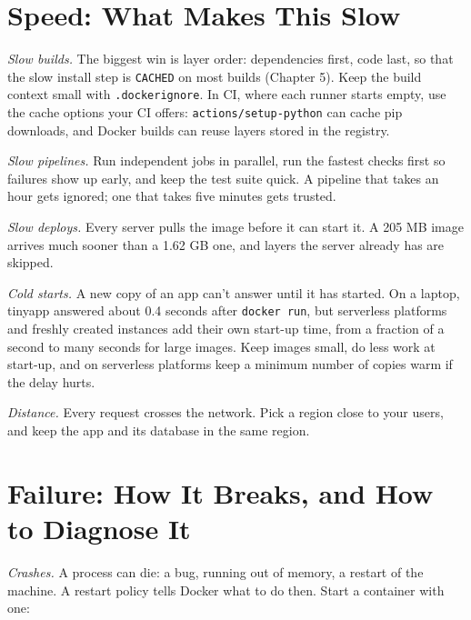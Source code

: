 \section{Speed: What Makes This Slow}\label{12-security-speed-failure-and-cost:speed-what-makes-this-slow}

\emph{Slow builds.} The biggest win is layer order: dependencies first, code last, so that the slow install step is \texttt{CACHED} on most builds (Chapter 5). Keep the build context small with \texttt{.dockerignore}. In CI, where each runner starts empty, use the cache options your CI offers: \texttt{actions/}\allowbreak{}\texttt{setup-python} can cache pip downloads, and Docker builds can reuse layers stored in the registry.

\emph{Slow pipelines.} Run independent jobs in parallel, run the fastest checks first so failures show up early, and keep the test suite quick. A pipeline that takes an hour gets ignored; one that takes five minutes gets trusted.

\emph{Slow deploys.} Every server pulls the image before it can start it. A 205 MB image arrives much sooner than a 1.62 GB one, and layers the server already has are skipped.

\emph{Cold starts.} A new copy of an app can't answer until it has started. On a laptop, tinyapp answered about 0.4 seconds after \texttt{docker\ run}, but serverless platforms and freshly created instances add their own start-up time, from a fraction of a second to many seconds for large images. Keep images small, do less work at start-up, and on serverless platforms keep a minimum number of copies warm if the delay hurts.

\emph{Distance.} Every request crosses the network. Pick a region close to your users, and keep the app and its database in the same region.


\section{Failure: How It Breaks, and How to Diagnose It}\label{12-security-speed-failure-and-cost:failure-how-it-breaks-and-how-to-diagnose-it}

\emph{Crashes.} A process can die: a bug, running out of memory, a restart of the machine. A restart policy tells Docker what to do then. Start a container with one:

\begin{codeblock}

\begin{Shaded}
\begin{Highlighting}[]
 
\end{Highlighting}
\end{Shaded}

\end{codeblock}

